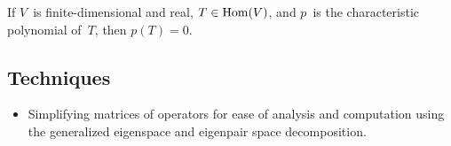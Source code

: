 \begin{thm}
If \(V\)~is finite-dimensional and real, \(T\in\operatorname{Hom}(V)\), and \(p\)~is the characteristic polynomial of~\(T\), then \(p(T)=0\).
\end{thm}

\subsection*{Techniques}
\begin{itemize}[itemsep=0pt]
\item Simplifying matrices of operators for ease of analysis and computation using the generalized eigenspace and eigenpair space decomposition.
\end{itemize}
